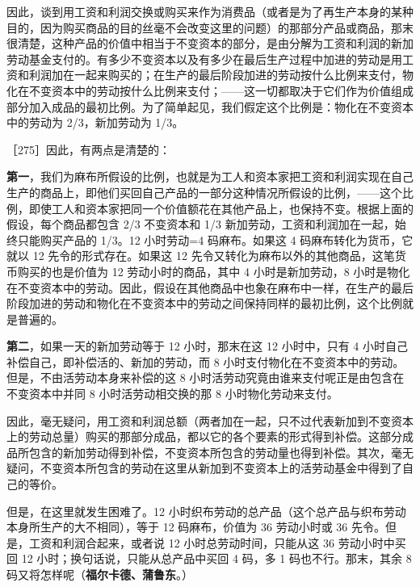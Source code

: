 因此，谈到用工资和利润交换或购买来作为消费品（或者是为了再生产本身的某种目的，因为购买商品的目的丝毫不会改变这里的问题）的那部分产品或商品，那末很清楚，这种产品的价值中相当于不变资本的部分，是由分解为工资和利润的新加劳动基金支付的。有多少不变资本以及有多少在最后生产过程中加进的劳动是用工资和利润加在一起来购买的；在生产的最后阶段加进的劳动按什么比例来支付，物化在不变资本中的劳动按什么比例来支付；——这一切都取决于它们作为价值组成部分加入成品的最初比例。为了简单起见，我们假定这个比例是：物化在不变资本中的劳动为 2/3，新加劳动为 1/3。

［275］因此，有两点是清楚的：

\textbf{第一}，我们为麻布所假设的比例，也就是为工人和资本家把工资和利润实现在自己生产的商品上，即他们买回自己产品的一部分这种情况所假设的比例，——这个比例，即使工人和资本家把同一个价值额花在其他产品上，也保持不变。根据上面的假设，每个商品都包含 2/3 不变资本和 1/3 新加劳动，工资和利润加在一起，始终只能购买产品的 1/3。12 小时劳动=4 码麻布。如果这 4 码麻布转化为货币，它就以 12 先令的形式存在。如果这 12 先令又转化为麻布以外的其他商品，这笔货币购买的也是价值为 12 劳动小时的商品，其中 4 小时是新加劳动，8 小时是物化在不变资本中的劳动。因此，假设在其他商品中也象在麻布中一样，在生产的最后阶段加进的劳动和物化在不变资本中的劳动之间保持同样的最初比例，这个比例就是普遍的。

\textbf{第二}，如果一天的新加劳动等于 12 小时，那末在这 12 小时中，只有 4 小时自己补偿自己，即补偿活的、新加的劳动，而 8 小时支付物化在不变资本中的劳动。但是，不由活劳动本身来补偿的这 8 小时活劳动究竟由谁来支付呢正是由包含在不变资本中并同 8 小时活劳动相交换的那 8 小时物化劳动来支付。

因此，毫无疑问，用工资和利润总额（两者加在一起，只不过代表新加到不变资本上的劳动总量）购买的那部分成品，都以它的各个要素的形式得到补偿。这部分成品所包含的新加劳动得到补偿，不变资本所包含的劳动量也得到补偿。其次，毫无疑问，不变资本所包含的劳动在这里从新加到不变资本上的活劳动基金中得到了自己的等价。

但是，在这里就发生困难了。12 小时织布劳动的总产品（这个总产品与织布劳动本身所生产的大不相同），等于 12 码麻布，价值为 36 劳动小时或 36 先令。但是，工资和利润合起来，或者说 12 小时总劳动时间，只能从这 36 劳动小时中买回 12 小时；换句话说，只能从总产品中买回 4 码，多 1 码也不行。那末，其余 8 码又将怎样呢（\textbf{福尔卡德、蒲鲁东}。）

